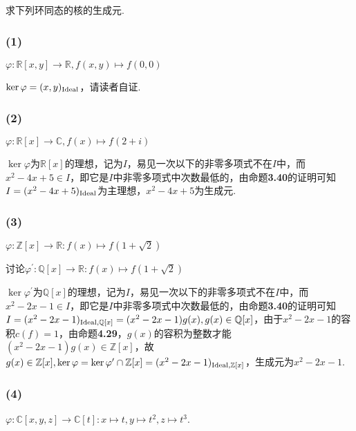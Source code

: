 
\subsection{}
求下列环同态的核的生成元.
\subsubsection{(1)} 
$\varphi:\mathbb{R}[x,y]\rightarrow \mathbb{R}, f(x,y)\mapsto f(0,0)$

\jie $\ker\varphi=(x,y)_{\operatorname{Ideal}}$，请读者自证.

\subsubsection{(2)}
$\varphi:\mathbb{R}[x]\rightarrow \mathbb{C}, f(x)\mapsto f(2+i)$

\jie $\ker\varphi$为$\mathbb{R}[x]$的理想，记为$I$，易见一次以下的非零多项式不在$I$中，而$x^2-4x+5\in I$，即它是$I$中非零多项式中次数最低的，由{\heiti 命题}\textbf{3.40}的证明可知$I=(x^2-4x+5)_{\operatorname{Ideal}}$为主理想，$x^2-4x+5$为生成元.

\subsubsection{(3)}
$\varphi: \mathbb{Z}[x]\rightarrow \mathbb{R}: f(x)\mapsto f(1+\sqrt{2})$

\jie 讨论$\varphi^{\prime}: \mathbb{Q}[x]\rightarrow \mathbb{R}: f(x)\mapsto f(1+\sqrt{2})$

 $\ker\varphi^{\prime}$为$\mathbb{Q}[x]$的理想，记为$I$，易见一次以下的非零多项式不在$I$中，而$x^2-2x-1\in I$，即它是$I$中非零多项式中次数最低的，由{\heiti 命题}\textbf{3.40}的证明可知$I=(x^2-2x-1)_{\operatorname{Ideal},\mathbb{Q}[x]}=(x^2-2x-1)g(x), g(x)\in\mathbb{Q}[x]$，由于$x^2-2x-1$的容积$c(f)=1$，由{\heiti 命题}\textbf{4.29}，$g(x)$的容积为整数才能$(x^2-2x-1)g(x)\in\mathbb{Z}[x]$，故$g(x)\in\mathbb{Z}[x], \ker\varphi=\ker\varphi^{\prime}\cap \mathbb{Z}[x]=(x^2-2x-1)_{\operatorname{Ideal}, \mathbb{Z}[x]}$，生成元为$x^2-2x-1$.
 
 \subsubsection{(4)}
 $\varphi: \mathbb{C}[x,y,z]\rightarrow\mathbb{C}[t]:x\mapsto t, y\mapsto t^2, z\mapsto t^3$.
 
